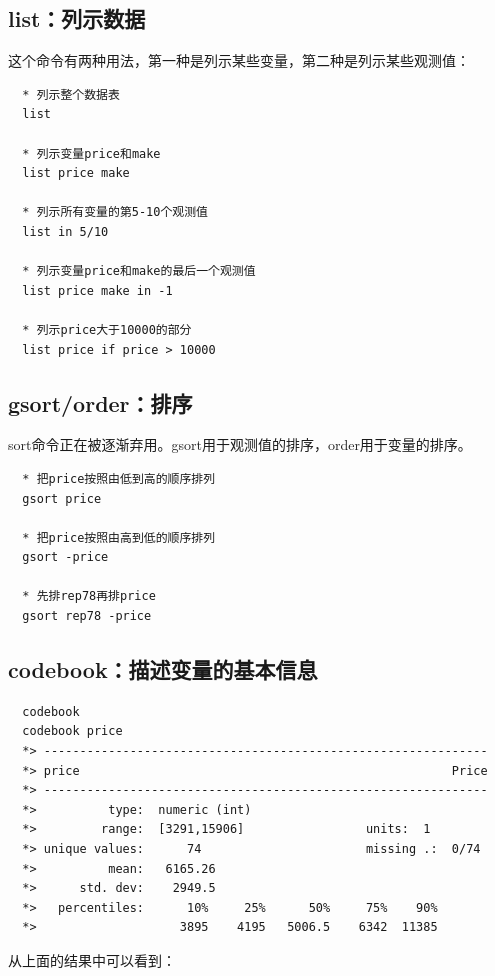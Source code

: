 \documentclass[cn,fancy,blue,11pt]{elegantbook}
\begin{document}
\subsection{list：列示数据}

这个命令有两种用法，第一种是列示某些变量，第二种是列示某些观测值：

\begin{lstlisting}
  * 列示整个数据表
  list

  * 列示变量price和make
  list price make

  * 列示所有变量的第5-10个观测值
  list in 5/10

  * 列示变量price和make的最后一个观测值
  list price make in -1

  * 列示price大于10000的部分
  list price if price > 10000
\end{lstlisting}

\subsection{gsort/order：排序}

sort命令正在被逐渐弃用。gsort用于观测值的排序，order用于变量的排序。

\begin{lstlisting}
  * 把price按照由低到高的顺序排列
  gsort price

  * 把price按照由高到低的顺序排列
  gsort -price

  * 先排rep78再排price
  gsort rep78 -price
\end{lstlisting}

\subsection{codebook：描述变量的基本信息}

\begin{lstlisting}
  codebook
  codebook price
  *> --------------------------------------------------------------
  *> price                                                    Price
  *> --------------------------------------------------------------
  *>          type:  numeric (int)
  *>         range:  [3291,15906]                 units:  1
  *> unique values:      74                       missing .:  0/74
  *>          mean:   6165.26
  *>      std. dev:    2949.5
  *>   percentiles:      10%     25%      50%     75%    90%
  *>                    3895    4195   5006.5    6342  11385
\end{lstlisting}

从上面的结果中可以看到：
\end{document}
